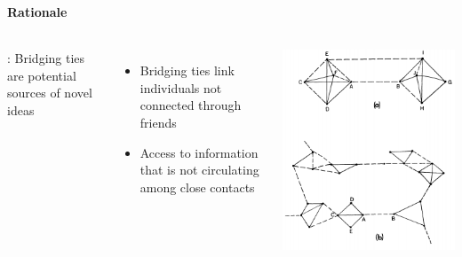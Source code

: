 \documentclass[8pt]{beamer}
\begin{document}
\begin{frame}
\frametitle{\insertsection}
\framesubtitle{Rationale}

\begin{columns}[c]
{\color{blue}{Premise 2}}: Bridging ties are potential sources of novel ideas

\begin{itemize}
\item Bridging ties link individuals not connected through friends
\item Access to information that is not circulating among close contacts
\end{itemize}


\centering
\includegraphics[width=\textwidth]{swt}\\
{\tiny \cite{Granovetter1973}}

\end{columns}

\end{frame}

\end{document}
